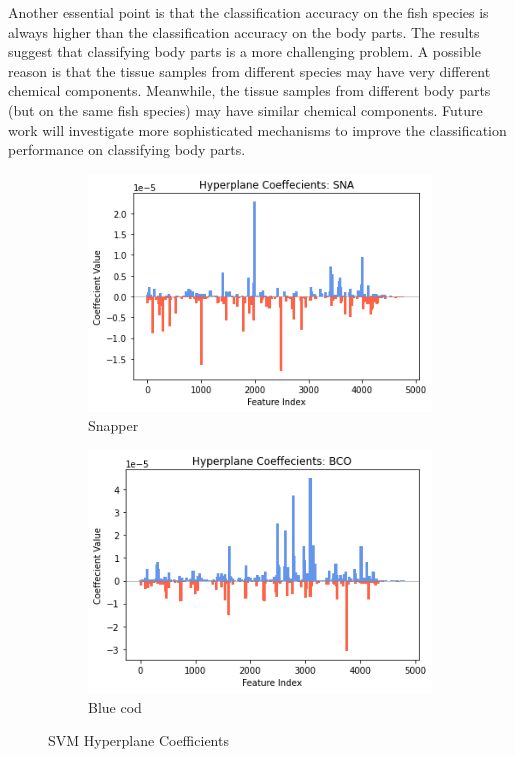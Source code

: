 \documentclass[runningheads]{llncs}
\begin{document}
Another essential point is that the classification accuracy on the fish species is always higher than the classification accuracy on the body parts. 
The results suggest that classifying body parts is a more challenging problem. 
A possible reason is that the tissue samples from different species may have very different chemical components. 
Meanwhile, the tissue samples from different body parts (but on the same fish species) may have similar chemical components. 
Future work will investigate more sophisticated mechanisms to improve the classification performance on classifying body parts. 

\begin{figure}[t]
	\centering
	\begin{subfigure}[b]{.49\linewidth}
		\includegraphics[width=\linewidth]{fish_hyperplane_sna.png}
		\caption{Snapper}\label{fig:hyperplane-sna}
	\end{subfigure}
	\begin{subfigure}[b]{.49\linewidth}
		\includegraphics[width=\linewidth]{fish_hyperplane_bco.png}
		\caption{Blue cod}\label{fig:hyperplane-bco}
	\end{subfigure}
 
	\caption[SVM Coef]{
		SVM Hyperplane Coefficients
	}
	\label{fig:svm-hyperplane}
\end{figure}
\end{document}
